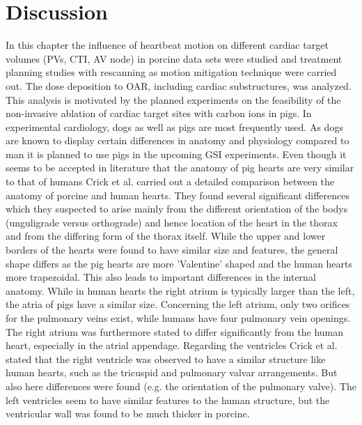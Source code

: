 \documentclass[type=dr, dr=rernat, accentcolor=tud7b,colorbacktitle, bigchapter, openright, twoside, 12pt ]{tudthesis}
\begin{document}
\newpage

\section{Discussion}
\label{pigs:diss}
In this chapter the influence of heartbeat motion on different cardiac target volumes (PVs, CTI, AV node) in porcine data sets were studied 
and treatment planning studies with rescanning as motion mitigation technique were carried out. The dose deposition to OAR, including 
cardiac substructures, was analyzed. This analysis is motivated by the planned experiments on the feasibility of the non-invasive ablation of 
cardiac target sites with carbon ions in pigs. In experimental cardiology, dogs as well as pigs are most frequently used. As dogs are known to 
display certain differences in anatomy and physiology compared to man \cite{Hug86} \cite{Cri98} it is planned to use pigs in the upcoming GSI 
experiments.\newline
\newline
Even though it seems to be accepted in literature that the anatomy of pig hearts are very similar to that of humans 
\cite{Lum66} \cite{Dou72} \cite{Hug86} \cite{Coo91} \cite{Whi93} Crick et al. \cite{Cri98} carried out a detailed comparison between the 
anatomy of porcine and human hearts. They found several significant differences which they suspected to arise mainly from the different 
orientation of the bodys (unguligrade versus orthograde) and hence location of the heart in the thorax and from the differing form of 
the thorax itself. While the upper and lower borders of the hearts were found to have similar size and features, the general shape differs as 
the pig hearts are more 'Valentine' shaped and the human hearts more trapezoidal. This also leads to important differences in the internal 
anatomy. While in human hearts the right atrium is typically larger than the left, the atria of pigs have a similar size. Concerning the left 
atrium, only two orifices for the pulmonary veins exist, while humans have four pulmonary vein openings. The right atrium was furthermore 
stated to differ significantly from the human heart, especially in the atrial appendage. 
Regarding the ventricles Crick et al. stated that the right ventricle was observed to have a similar structure like human hearts, such as 
the tricuspid and pulmonary valvar arrangements. But also here differences were found (e.g. the orientation of the pulmonary valve). 
The left ventricles seem to have similar features to the human structure, but the ventricular wall was found to be much thicker in porcine. 
\end{document}
